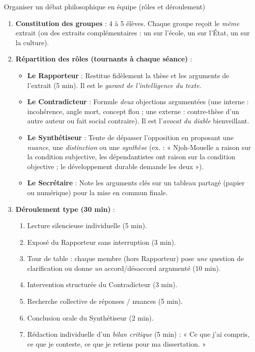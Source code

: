 \documentclass[11pt]{article}
\begin{document}
\begin{methode}{Organiser un débat philosophique en équipe (rôles et déroulement)}
\begin{enumerate}
    \item \textbf{Constitution des groupes} : 4 à 5 élèves. Chaque groupe reçoit le \emph{même} extrait (ou des extraits complémentaires : un sur l'école, un sur l'État, un sur la culture).
    \item \textbf{Répartition des rôles (tournants à chaque séance)} :
    \begin{itemize}
        \item \textbf{Le Rapporteur} : Restitue fidèlement la thèse et les arguments de l'extrait (5 min). Il est le \emph{garant de l'intelligence du texte}.
        \item \textbf{Le Contradicteur} : Formule \emph{deux} objections argumentées (une interne : incohérence, angle mort, concept flou ; une externe : contre-thèse d'un autre auteur ou fait social contraire). Il est l'\emph{avocat du diable} bienveillant.
        \item \textbf{Le Synthétiseur} : Tente de dépasser l'opposition en proposant une \emph{nuance}, une \emph{distinction} ou une \emph{synthèse} (ex. : « Njoh-Mouelle a raison sur la condition subjective, les dépendantistes ont raison sur la condition objective ; le développement durable demande les deux »).
        \item \textbf{Le Secrétaire} : Note les arguments clés sur un tableau partagé (papier ou numérique) pour la mise en commun finale.
    \end{itemize}
    \item \textbf{Déroulement type (30 min)} :
    \begin{enumerate}
        \item Lecture silencieuse individuelle (5 min).
        \item Exposé du Rapporteur sans interruption (3 min).
        \item Tour de table : chaque membre (hors Rapporteur) pose \emph{une} question de clarification ou donne \emph{un} accord/désaccord argumenté (10 min).
        \item Intervention structurée du Contradicteur (3 min).
        \item Recherche collective de réponses / nuances (5 min).
        \item Conclusion orale du Synthétiseur (2 min).
        \item Rédaction individuelle d'un \emph{bilan critique} (5 min) : « Ce que j'ai compris, ce que je conteste, ce que je retiens pour ma dissertation. »
    \end{enumerate}
\end{enumerate}
\end{methode}
\end{document}
